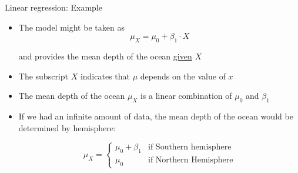 \documentclass[10pt]{beamer}\usepackage[]{graphicx}\usepackage[]{color}
\begin{document}
\begin{frame}{Linear regression: Example}
	
	\begin{itemize}
		\setlength\itemsep{1.7em}
		\item The model might be taken as 
		$$
		\mu_X = \mu_0 + \beta_1 \cdot X 
		$$
		
		and provides the mean depth of the ocean \underline{given} $X$ 
		
		\item The subscript $X$ indicates that $\mu$ depends on the value of $x$
		
		\item The mean depth of the ocean $\mu_X$ is a linear combination of $\mu_0$ and $\beta_1$ 
		
			
		\item If we had an infinite amount of data, the mean depth of the ocean would be determined by hemisphere:
		
		$$
		\mu_X = \begin{cases}
		\mu_0 + \beta_1  &  \textrm{if Southern hemisphere}\\
		\mu_0  &  \textrm{if Northern Hemisphere}
		\end{cases}
		$$
		
	\end{itemize}
	
\end{frame}
\end{document}

